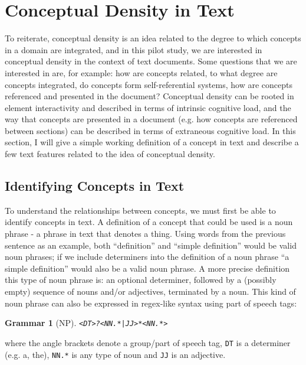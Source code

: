 \documentclass[12pt]{article}
\theoremstyle{grammarstyle}
\newtheorem{gram}{Grammar}
\begin{document}
\section{Conceptual Density in Text} \label{sec:conceptual_density_in_text}
To reiterate, conceptual density is an idea related to the degree to which concepts in a domain are integrated, and in this pilot study, we are interested in conceptual density in the context of text documents. Some questions that we are interested in are, for example: how are concepts related, to what degree are concepts integrated, do concepts form self-referential systems, how are concepts referenced and presented in the document? Conceptual density can be rooted in element interactivity and described in terms of intrinsic cognitive load, and the way that concepts are presented in a document (e.g. how concepts are referenced between sections) can be described in terms of extraneous cognitive load. In this section, I will give a simple working definition of a concept in text and describe a few text features related to the idea of conceptual density.

\subsection{Identifying Concepts in Text} \label{sec:idenifying_concepts}
To understand the relationships between concepts, we must first be able to identify concepts in text. A definition of a concept that could be used is a noun phrase - a phrase in text that denotes a thing. Using words from the previous sentence as an example, both ``definition'' and ``simple definition'' would be valid noun phrases; if we include determiners into the definition of a noun phrase ``a simple definition'' would also be a valid noun phrase. A more precise definition this type of noun phrase is: an optional determiner, followed by a (possibly empty) sequence of nouns and/or adjectives, terminated by a noun. This kind of noun phrase can also be expressed in regex-like syntax using part of speech tags:
\begin{gram}[NP] \label{gr:np_pattern}
\texttt{<DT>?<NN.*|JJ>*<NN.*>}
\end{gram}
\noindent
where the angle brackets denote a group/part of speech tag, \texttt{DT} is a determiner (e.g. a, the), \texttt{NN.*} is any type of noun and \texttt{JJ} is an adjective.
\end{document}
